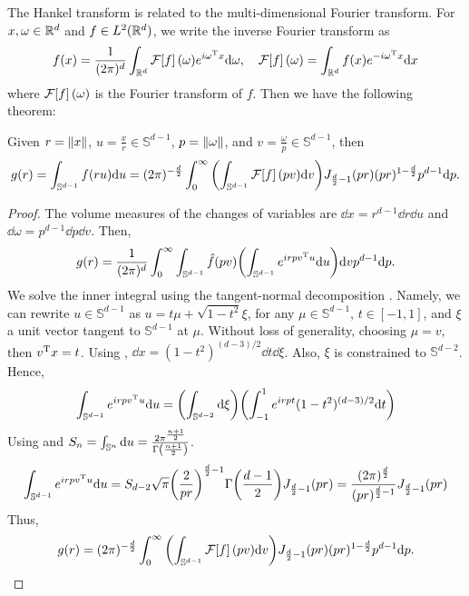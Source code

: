 \documentclass[../../main.tex]{subfiles}
\begin{document}
\begin{refsection}
	The Hankel transform is related to the multi-dimensional Fourier transform.
	For $x,\omega \in \mathbb{R}^d$ and $f \in L^2(\mathbb{R}^d)$, we write the inverse Fourier transform as
	$$f(x) = \frac{1}{(2\pi)^{d}} \int_{\mathbb{R}^d} \mathcal{F}\qty[f](\omega) e^{i {\omega}^\mathrm{T} x} \dd \omega, \quad \mathcal{F}\qty[f](\omega) = \int_{\mathbb{R}^d} f(x) e^{-i {\omega}^\mathrm{T} x} \dd x $$
	where $\mathcal{F}\qty[f](\omega)$ is the Fourier transform of $f$.
	Then we have the following theorem:

	\begin{theorem}\label{hankel_fourier}
		Given $r = \norm{x}$, $u = \frac{x}{r} \in \mathbb{S}^{d-1}$, $p = \norm{\omega}$, and $v = \frac{\omega}{p} \in \mathbb{S}^{d-1}$, then
		$$g(r) = \int_{\mathbb{S}^{d-1}} f(r u) \dd u = (2\pi)^{-\frac{d}{2}} \int_0^\infty \qty(\int_{\mathbb{S}^{d-1}} \mathcal{F}\qty[f](p v) \dd v) J_{\frac{d}{2}-1}(p r) (p r)^{1 - \frac{d}{2}} p^{d - 1} \dd p.$$
	\end{theorem}
	\begin{proof}
		The volume measures of the changes of variables are $\dd x = r^{d-1} \dd r \dd u$ and $\dd \omega = p^{d-1} \dd p \dd v$.
		Then,
		$$g(r) = \frac{1}{(2\pi)^d} \int_0^\infty \int_{\mathbb{S}^{d - 1}} \hat{f}(p v) \qty(\int_{\mathbb{S}^{d - 1}} e^{i r p {v}^\mathrm{T} u} \dd u) \dd v p^{d-1} \dd p.$$
		We solve the inner integral using the tangent-normal decomposition \supercite{mardiaDirectionalStatistics1999}.
		Namely, we can rewrite $u \in \mathbb{S}^{d-1}$ as $u = t \mu + \sqrt{1 - t^2} \xi$, for any $\mu \in \mathbb{S}^{d-1}$, $t \in [-1, 1]$, and $\xi$ a unit vector tangent to $\mathbb{S}^{d-1}$ at $\mu$.
		Without loss of generality, choosing $\mu = v$, then ${v}^\mathrm{T} x = t$.
		Using \cite[Eq. 9.3.1]{mardiaDirectionalStatistics1999}, $\dd x = (1 - t^2)^{(d - 3) / 2} \dd t \dd \xi$.
		Also, $\xi$ is constrained to $\mathbb{S}^{d-2}$.
		Hence,
		$$\int_{\mathbb{S}^{d - 1}} e^{i r p {v}^\mathrm{T} u} \dd u = \qty(\int_{\mathbb{S}^{d - 2}} \dd \xi) \qty(\int_{-1}^{1} e^{i r p t} (1 - t^2)^{(d - 3) / 2} \dd t)$$
		Using \cite[Eq. 3.387.2]{gradshteynTableIntegralsSeries2007} and $S_n = \int_{\mathbb{S}^n} \dd u = \frac{2 \pi^{\frac{n+1}{2}}}{\Gamma\qty(\frac{n+1}{2})}$.
		\begin{equation*}
			\int_{\mathbb{S}^{d - 1}} e^{i r p {v}^\mathrm{T} u} \dd u = S_{d-2} \sqrt{\pi} \qty(\frac{2}{p r})^{\frac{d}{2}-1} \Gamma\qty(\frac{d - 1}{2}) J_{\frac{d}{2}-1}(p r) =
			\frac{(2 \pi)^{\frac{d}{2}}}{(pr)^{\frac{d}{2}-1}} J_{\frac{d}{2}-1}(p r)
		\end{equation*}
		Thus,
		$$g(r) = (2\pi)^{-\frac{d}{2}} \int_0^\infty \qty(\int_{\mathbb{S}^{d-1}} \mathcal{F}\qty[f](p v) \dd v) J_{\frac{d}{2}-1}(p r) (p r)^{1 - \frac{d}{2}} p^{d - 1} \dd p.$$
	\end{proof}


\end{refsection}
\end{document}
